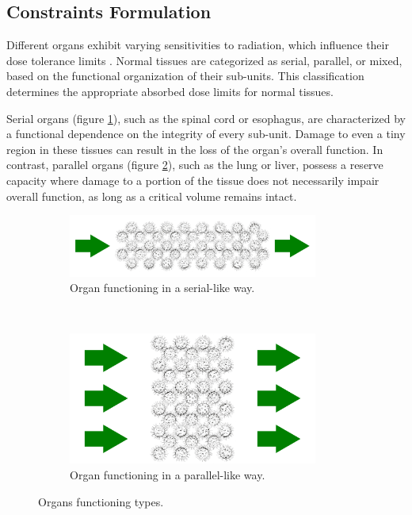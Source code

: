 \subsection{Constraints Formulation}
Different organs exhibit varying sensitivities to radiation, which influence their dose tolerance limits \cite{Withers1988} \cite{ICRU83}.
Normal tissues are categorized as serial, parallel, or mixed, based on the functional organization of their sub-units.
This classification determines the appropriate absorbed dose limits for normal tissues.

Serial organs (figure \ref{fig:serial_organ}), such as the spinal cord or esophagus, are characterized by a functional dependence on the integrity of every sub-unit.
Damage to even a tiny region in these tissues can result in the loss of the organ's overall function.
In contrast, parallel organs (figure \ref{fig:parallel_organ}), such as the lung or liver, possess a reserve capacity where damage to a portion of the tissue does not necessarily impair overall function, as long as a critical volume remains intact.

\begin{figure}
	\begin{subfigure}{0.6\textwidth}
		\centering
		\includegraphics[width=0.9\textwidth]{serial_organ.pdf}
		\vspace{4mm}
		\caption{Organ functioning in a serial-like way.}
		\label{fig:serial_organ}
	\end{subfigure}
	\hfill
	\unskip\ \vrule\
	\hfill
	\begin{subfigure}{0.38\textwidth}
		\centering
		\includegraphics[width=0.9\textwidth]{parallel_organ.pdf}
		\caption{Organ functioning in a parallel-like way.}
		\label{fig:parallel_organ}
	\end{subfigure}
	\caption{Organs functioning types.}
	\label{fig:serial_parallel_organ}	
\end{figure}

